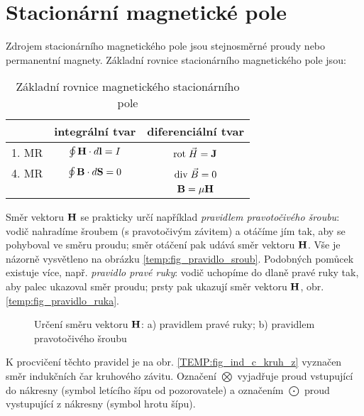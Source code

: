   \newpage
  \section{Stacionární magnetické pole}
    Zdrojem stacionárního magnetického pole jsou stejnosměrné proudy nebo permanentní magnety.
    Základní rovnice stacionárního magnetického pole jsou:

    \begin{table}[ht!]
      \centering
      \begin{tabular}{lc|c|}
        \cline{2-3}
        \multicolumn{1}{l|}{} & \textbf{integrální tvar} & \textbf{diferenciální tvar} \\
        \hline
        \multicolumn{1}{|l|}{1. MR} & $\oint\mathbf{H}\cdot d\mathbf{l} = I$ & $\mathrm{rot}\;\vec{H} = \mathbf{J}$ \\ 
        \cline{1-3}
        \hline
        \multicolumn{1}{|l|}{4. MR} & $\oint\mathbf{B}\cdot d\mathbf{S} = 0$ & $\mathrm{div}\;\vec{B} = 0$ \\
        \cline{1-3}
        & & $\mathbf{B} = \mu \mathbf{H}$ \\
        \cline{3-3}
      \end{tabular}
      \caption{Základní rovnice magnetického stacionárního pole}
    \end{table}

    Směr vektoru $\mathbf{H}$ se prakticky určí například \emph{pravidlem pravotočivého šroubu}: vodič
    nahradíme šroubem (s pravotočivým závitem) a otáčíme jím tak, aby se pohyboval ve směru proudu;
    směr otáčení pak udává směr vektoru $\mathbf{H}$. Vše je názorně vysvětleno na obrázku
    \ref{temp:fig_pravidlo_sroub}. Podobných pomůcek existuje více, např. \emph{pravidlo pravé
    ruky}: vodič uchopíme do dlaně pravé ruky tak, aby palec ukazoval směr proudu; prsty pak
    ukazují směr vektoru $\mathbf{H}$, obr. \ref{temp:fig_pravidlo_ruka}.

         \begin{figure}[ht!]
           \centering
           \hspace{2cm}
           \caption[Pravidlo pravé ruku a pravotočivého šroubu]{Určení směru vektoru $\mathbf{H}$: a)
                   pravidlem pravé ruky; b) pravidlem pravotočivého šroubu}
           \label{temp:fig_urceni_H}
         \end{figure}
    K procvičení těchto pravidel je na obr. \ref{TEMP:fig_ind_c_kruh_z} vyznačen směr indukčních
    čar kruhové\-ho závitu. Označení $\bigotimes$ vyjadřuje proud vstupující  do nákresny (symbol
    letícího šípu od pozorovatele) a označením $\bigodot$ proud vystupující z nákresny (symbol
    hrotu šípu).
    
